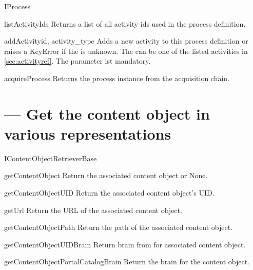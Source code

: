   \begin{classdesc}{IProcess}{}
    
    \begin{funcdesc}{listActivityIds}{}
      Returns a list of all activity ids used in the process definition.
    \end{funcdesc}

    \begin{funcdesc}{addActivity}{id, activity_type}
      Adds a new activity to this process definition or raises a 
      KeyError if the  is unknown. The 
       can be one of the listed activities in 
      \ref{sec:activityref}. The  parameter ist mandatory.
    \end{funcdesc}

    \begin{funcdesc}{acquireProcess}{}
      Returns the process instance from the acquisition chain.
    \end{funcdesc}

  \end{classdesc}

  \section{ --- Get the content object in various representations}


    \begin{classdesc}{IContentObjectRetrieverBase}{}

      \begin{funcdesc}{getContentObject}{}
        Return the associated content object or None.
      \end{funcdesc}

      \begin{funcdesc}{getContentObjectUID}{}
            Return the associated content object's UID.
      \end{funcdesc}

      \begin{funcdesc}{getUrl}{}
            Return the URL of the associated content object.
      \end{funcdesc}

      \begin{funcdesc}{getContentObjectPath}{}
            Return the path of the associated content object.
      \end{funcdesc}

      \begin{funcdesc}{getContentObjectUIDBrain}{}
          Return brain from  for associated content object.
      \end{funcdesc}

      \begin{funcdesc}{getContentObjectPortalCatalogBrain}{}
          Return the  brain for the content object.
      \end{funcdesc}

    \end{classdesc}

